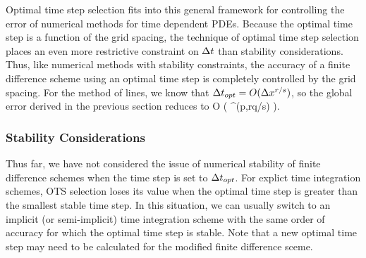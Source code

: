 \documentclass[oneeqnum,onefignum,onetabnum,onethmnum]{siamltex}
\begin{document}
Optimal time step selection fits into this general framework for controlling
the error of numerical methods for time dependent PDEs.  Because the optimal 
time step is a function of the grid spacing, the technique of optimal time 
step selection places an even more restrictive constraint on $\Delta t$ than 
stability considerations.  Thus, like numerical methods with stability 
constraints, the accuracy of a finite difference scheme using an optimal time 
step is completely controlled by the grid spacing.  For the method of lines, 
we know that $\Delta t_{opt} = O(\Delta x^{r/s})$, so the global error derived in the 
previous section reduces to 
\beq
O \left( \dx^{\min(p,rq/s)} \right).
\label{eq:global_error_ots_simplified}
\eeq


\subsubsection*{Stability Considerations}
Thus far, we have not considered the issue of numerical stability of finite
difference schemes when the time step is set to $\Delta t_{opt}$.  For explict time 
integration schemes, OTS selection loses its value when the optimal time step 
is greater than the smallest stable time step.  In this situation, we can 
usually switch to an implicit (or semi-implicit) time integration scheme with 
the same order of accuracy for which the optimal time step is stable.  Note 
that a new optimal time step may need to be calculated for the modified finite
difference sceme.
\end{document}
